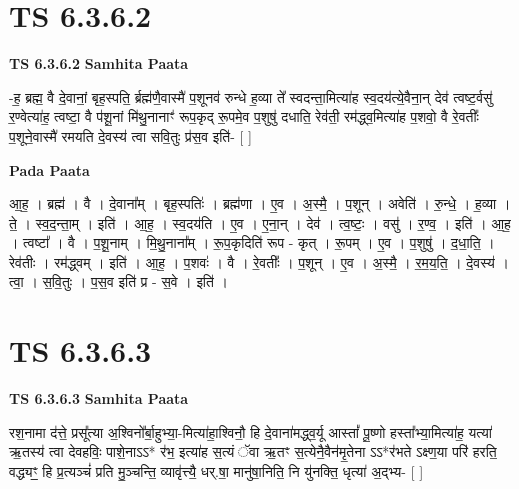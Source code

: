 \documentclass[17pt]{extarticle}
\begin{document}
\section*{ TS 6.3.6.2 }

\textbf{TS 6.3.6.2 } \newline
\textbf{Samhita Paata} \newline

-ह॒ ब्रह्म॒ वै दे॒वानां॒ बृह॒स्पति॒ र्ब्रह्म॑णै॒वास्मै॑ प॒शूनव॑ रुन्धे ह॒व्या ते᳚ स्वदन्ता॒मित्या॑ह स्व॒दय॑त्ये॒वैना॒न् देव॑ त्वष्ट॒र्वसु॑ र॒ण्वेत्या॑ह॒ त्वष्टा॒ वै प॑शू॒नां मि॑थु॒नानाꣳ॑ रूप॒कृद् रू॒पमे॒व प॒शुषु॑ दधाति॒ रेव॑ती॒ रम॑द्ध्व॒मित्या॑ह प॒शवो॒ वै रे॒वतीः᳚ प॒शूने॒वास्मै॑ रमयति दे॒वस्य॑ त्वा सवि॒तुः प्र॑स॒व इति॑- [  ] \newline

\textbf{Pada Paata} \newline

आ॒ह॒ । ब्रह्म॑ । वै । दे॒वाना᳚म् । बृह॒स्पतिः॑ । ब्रह्म॑णा । ए॒व । अ॒स्मै॒ । प॒शून् । अवेति॑ । रु॒न्धे॒ । ह॒व्या । ते॒ । स्व॒द॒न्ता॒म् । इति॑ । आ॒ह॒ । स्व॒दय॑ति । ए॒व । ए॒ना॒न् । देव॑ । त्व॒ष्टः॒ । वसु॑ । र॒ण्व॒ । इति॑ । आ॒ह॒ । त्वष्टा᳚ । वै । प॒शू॒नाम् । मि॒थु॒नाना᳚म् । रू॒प॒कृदिति॑ रूप - कृत् । रू॒पम् । ए॒व । प॒शुषु॑ । द॒धा॒ति॒ । रेव॑तीः । रम॑द्ध्वम् । इति॑ । आ॒ह॒ । प॒शवः॑ । वै । रे॒वतीः᳚ । प॒शून् । ए॒व । अ॒स्मै॒ । र॒म॒य॒ति॒ । दे॒वस्य॑ । त्वा॒ । स॒वि॒तुः । प॒स॒व इति॑ प्र - स॒वे । इति॑ ।  \newline




\section*{ TS 6.3.6.3 }

\textbf{TS 6.3.6.3 } \newline
\textbf{Samhita Paata} \newline

रश॒नामा द॑त्ते॒ प्रसू᳚त्या अ॒श्विनो᳚र्बा॒हुभ्या॒-मित्या॑हा॒श्विनौ॒ हि दे॒वाना॑मद्ध्व॒र्यू आस्तां᳚ पू॒ष्णो हस्ता᳚भ्या॒मित्या॑ह॒ यत्या॑ ऋ॒तस्य॑ त्वा देवहविः॒ पाशे॒नाऽऽ* र॑भ॒ इत्या॑ह स॒त्यं ॅवा ऋ॒तꣳ स॒त्येनै॒वैन॑मृ॒तेना ऽऽ*र॑भते ऽक्ष्ण॒या परि॑ हरति॒ वद्ध्यꣳ॒॒ हि प्र॒त्यञ्चं॑ प्रति मु॒ञ्चन्ति॒ व्यावृ॑त्त्यै॒ धर्.षा॒ मानु॑षा॒निति॒ नि यु॑नक्ति॒ धृत्या॑ अ॒द्भ्य- [  ] \newline
\end{document}
